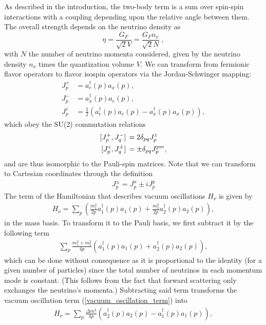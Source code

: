 \documentclass[10pt]{article}
\begin{document}
As described in the introduction, the two-body term is a sum over spin-spin interactions with a coupling depending upon the relative angle between them. The overall strength depends on the neutrino density as
\begin{equation}
\label{eq:eta}
\eta=\frac{G_F}{\sqrt{2}V}=\frac{G_F n_\nu}{\sqrt{2}N}\;,
\end{equation}
with $N$ the number of neutrino momenta considered, given by the neutrino density $n_\nu$ times the quantization volume $V$. We can transform from fermionic flavor operators to flavor isospin operators via the Jordan-Schwinger mapping:
\begin{align}
\label{flavor_fermionic_to_isospin_jp}
J^+_p&=a^\dagger_e(p)a_x(p),
\\
\label{flavor_fermionic_to_isospin_jm}
J^-_p&=a^\dagger_x(p)a_e(p),
\\
\label{flavor_fermionic_to_isospin_jz}
J^z_p&=\frac{1}{2}\left(a^\dagger_e(p)a_e(p)-a^\dagger_x(p)a_x(p)\right)
,\end{align}
which obey the SU(2) commutation relations
\begin{align}
\comm*{J^+_p}{J^-_q}&=2\delta_{pq}J^z_p
\\
\comm*{J^z_p}{J^{\pm}_q}&=\pm\delta_{pq}J^{pm}_p
,\end{align}
and are thus isomorphic to the Pauli-spin matrices. Note that we can transform to Cartesian coordinates through the definition
\begin{align}
J^\pm_p=J^x_p\pm iJ^y_p
\end{align}
The term of the Hamiltonian that describes vacuum oscillations $H_\nu$ is given by
\begin{align}
\label{vacuum_oscillation_term}
H_\nu = \sum_{p}\left(\frac{m_1^2}{2p}a^\dagger_1(p)a_1(p)+\frac{m_2^2}{2p}a^\dagger_2(p)a_2(p)\right)
,\end{align}
in the mass basis. To transform it to the Pauli basis, we first subtract it by the following term
\begin{align}
\sum_p\frac{m_1^2+m_2^2}{4p}\left(a^\dagger_1(p)a_1(p)+a^\dagger_2(p)a_2(p)\right)
,\end{align}
which can be done without consequence as it is proportional to the identity (for a given number of particles) since the total number of neutrinos in each momentum mode is constant. (This follows from the fact that forward scattering only exchanges the neutrino's momenta.) Subtracting said term transforms the vacuum oscillation term (\ref{vacuum_oscillation_term}) into
\begin{align}
\label{vacuum_oscillation_term2}
H_\nu = \sum_p\frac{\Delta m^2}{4p}\left(a^\dagger_2(p)a_2(p)-a^\dagger_1(p)a_1(p)\right)
,\end{align}
\end{document}
